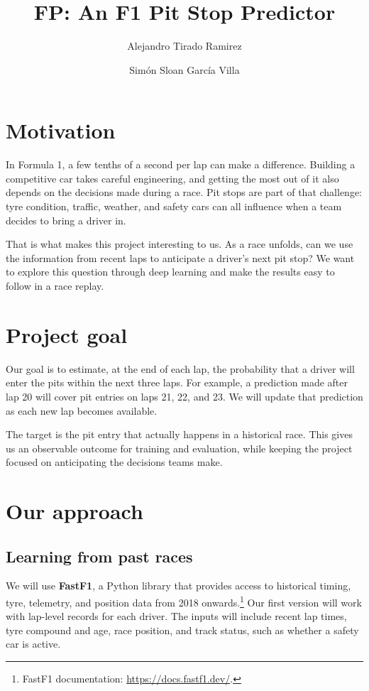 \documentclass[11pt]{article}
\author{Alejandro Tirado Ramirez \and Simón Sloan García Villa}
\title{FP: An F1 Pit Stop Predictor}
\begin{document}
\maketitle

\section{Motivation}

In Formula 1, a few tenths of a second per lap can make a difference. Building a competitive car takes careful engineering, and getting the most out of it also depends on the decisions made during a race. Pit stops are part of that challenge: tyre condition, traffic, weather, and safety cars can all influence when a team decides to bring a driver in.

That is what makes this project interesting to us. As a race unfolds, can we use the information from recent laps to anticipate a driver's next pit stop? We want to explore this question through deep learning and make the results easy to follow in a race replay.

\section{Project goal}

Our goal is to estimate, at the end of each lap, the probability that a driver will enter the pits within the next three laps. For example, a prediction made after lap 20 will cover pit entries on laps 21, 22, and 23. We will update that prediction as each new lap becomes available.

The target is the pit entry that actually happens in a historical race. This gives us an observable outcome for training and evaluation, while keeping the project focused on anticipating the decisions teams make.

\section{Our approach}

\subsection{Learning from past races}

We will use \textbf{FastF1}, a Python library that provides access to historical timing, tyre, telemetry, and position data from 2018 onwards.\footnote{FastF1 documentation: \url{https://docs.fastf1.dev/}.} Our first version will work with lap-level records for each driver. The inputs will include recent lap times, tyre compound and age, race position, and track status, such as whether a safety car is active.
\end{document}
